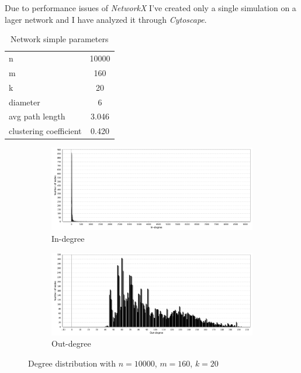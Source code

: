 \documentclass[12pt]{article}
\begin{document}
Due to performance issues of \textit{NetworkX} I've created only a single simulation on a lager network and I have analyzed it through \textit{Cytoscape}.

\begin{table}[H]
\centering
\begin{tabular}{|l|c|}
n                      & 10000 \\
m                      & 160   \\
k                      & 20    \\
diameter               & 6     \\
avg path length        & 3.046 \\
clustering coefficient & 0.420
\end{tabular}
\caption{Network simple parameters}
\label{table:network_params}
\end{table}


\begin{figure}[H]
    \centering
    \begin{subfigure}[t]{.7\linewidth}
        \centering
        \includegraphics[width=\textwidth]{assets/in_deg_dist_n10000_m160_k20.png} 
        \caption{In-degree}
    \end{subfigure}
    
    \begin{subfigure}[t]{.7\linewidth}
        \centering
        \includegraphics[width=\textwidth]{assets/out_deg_dist_n10000_m160_k20.png} 
        \caption{Out-degree}
    \end{subfigure}
    
    \caption{Degree distribution with $n=10000$, $m=160$, $k=20$}
    \label{fig:bignetwork1}
\end{figure}
\end{document}
